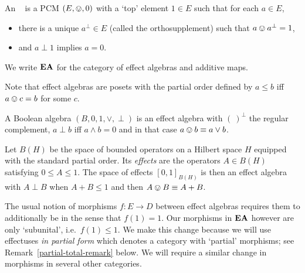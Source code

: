 \documentclass[%
	submission,
copyright,creativecommons,UKenglish]{eptcs}
\begin{document}
\begin{definition}
\label{def:EA}
    An ~\cite{foulis1994effect} is a PCM $(E,\ovee, 0)$
with a `top' element $1\in E$ such that
for each $a\in E$,
\begin{itemize}
	\item there is a unique $a^\bot\in E$
	(called the orthosupplement) such that $a\ovee a^\bot=1$,
	\item and $a\perp 1$ implies $a=0$.
\end{itemize}
We write $\mathbf{EA}$ for the category of
effect algebras and additive maps.
\end{definition}
Note that effect algebras are posets with the partial order defined by $a\leq b$ iff $a\ovee c = b$ for some $c$.

\begin{example}\label{ex:Boolean-is-effect-algebra}
  A Boolean algebra $(B,0,1,\vee, \perp)$ is an effect algebra with
    $(\ )^\bot$ the regular complement, $a\perp b$ iff $a \wedge b = 0$
  and in that case $a\ovee b \equiv a\vee b$.
\end{example}

\begin{example}
  \label{ex:standard-effect-algebra}
  Let $B(H)$ be the space of bounded operators on a Hilbert space $H$
  equipped with the standard partial order. Its \emph{effects} are
  the operators $A\in B(H)$ satisfying $0\leq A\leq 1$. The space
  of effects $[0,1]_{B(H)}$ is then an effect algebra with $A\perp
  B$ when $A+B \leq 1$ and then $A\ovee B\equiv A+B$.
\end{example}

\begin{remark}\label{partial-remark}
The usual notion of morphisms
$f\colon E\to D$ between
effect algebras requires them to additionally be  in the sense that $f(1)=1$.
Our morphisms in $\mathbf{EA}$ however are only
`subunital', i.e.\ $f(1)\le 1$.
We make this change
because
we will use effectuses \emph{in partial form}
which denotes a category
with `partial' morphisms;
see Remark~\ref{partial-total-remark} below.
We will require a similar change in morphisms
in several other categories.
\end{remark}
\end{document}
